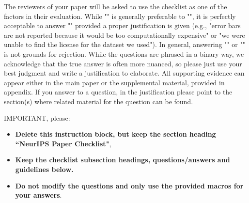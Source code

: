 \documentclass{article}
\begin{document}
The reviewers of your paper will be asked to use the checklist as one of the factors in their evaluation. While "\answerYes{}" is generally preferable to "\answerNo{}", it is perfectly acceptable to answer "\answerNo{}" provided a proper justification is given (e.g., "error bars are not reported because it would be too computationally expensive" or "we were unable to find the license for the dataset we used"). In general, answering "\answerNo{}" or "\answerNA{}" is not grounds for rejection. While the questions are phrased in a binary way, we acknowledge that the true answer is often more nuanced, so please just use your best judgment and write a justification to elaborate. All supporting evidence can appear either in the main paper or the supplemental material, provided in appendix. If you answer \answerYes{} to a question, in the justification please point to the section(s) where related material for the question can be found.

IMPORTANT, please:
\begin{itemize}
    \item {\bf Delete this instruction block, but keep the section heading ``NeurIPS Paper Checklist"},
    \item  {\bf Keep the checklist subsection headings, questions/answers and guidelines below.}
    \item {\bf Do not modify the questions and only use the provided macros for your answers}.
\end{itemize}


\end{document}
